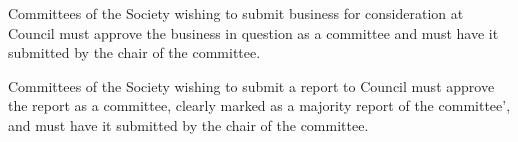 \begin{longenum}[ label*=\thesubsection.\arabic*., align=left]
	\item Committees of the Society wishing to submit business for consideration at Council must approve the business in question as a committee and must have it submitted by the chair of the committee.
	\begin{longenum}[ label*=\arabic*., align=left]
		\item Committees of the Society wishing to submit a report to Council must approve the report as a committee, clearly marked as a majority report of the committee', and must have it submitted by the chair of the committee.


\end{longenum}
\end{longenum}
